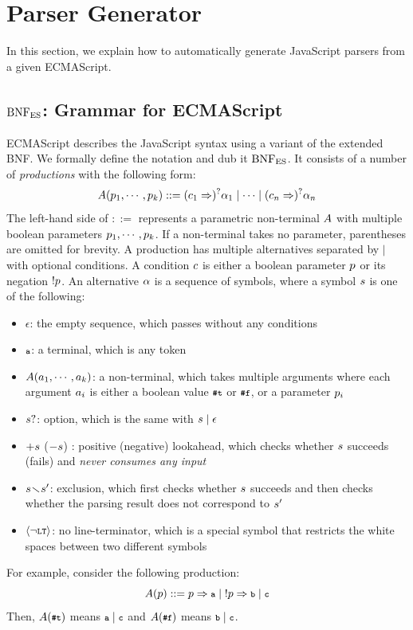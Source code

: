 \section{Parser Generator}\label{sec:parser}
In this section, we explain how to automatically generate JavaScript
parsers from a given ECMAScript.

\subsection{\( \text{BNF}_{\text{ES}} \): Grammar for ECMAScript}
ECMAScript describes the JavaScript syntax using a variant of the extended BNF.
We formally define the notation and dub it \( \text{BNF}_{\text{ES}} \).  It consists of a
number of \textit{productions} with the following form:
\[
  A(p_1, \cdots, p_k) ::=
  (c_1 \Rightarrow)^? \alpha_1 \mid
  \cdots \mid
  (c_n \Rightarrow)^? \alpha_n
\]
The left-hand side of $::=$ represents a parametric non-terminal \( A \)
with multiple boolean parameters \( p_1, \cdots, p_k \).
If a non-terminal takes no parameter, parentheses are omitted for brevity.
A production has multiple alternatives separated by $\mid$ with optional conditions.
A condition \( c \) is either a boolean parameter \( p \)
or its negation \( ! p \).  An alternative \( \alpha \) is a sequence
of symbols, where a symbol \( s \) is one of the following:
\begin{itemize}[leftmargin=0.5cm]
\item \( \epsilon \): the empty sequence, which passes without any conditions
\item \( \texttt{\footnotesize a} \): a terminal, which is any token
\item \( A(a_1, \cdots, a_k) \): a non-terminal,
which takes multiple arguments where each argument \( a_i \) is
either a boolean value \( \texttt{\footnotesize\#t} \) or \( \texttt{\footnotesize\#f} \), or a parameter \( p_i \)
\item \( s? \): option, which is the same with \( s \mid \epsilon \)
\item \( +s \) (\( -s \)) : positive (negative) lookahead,
which checks whether \( s \) succeeds (fails) and
\textit{never consumes any input}
\item \( s \!\smallsetminus\! s' \): exclusion, which
first checks whether \( s \) succeeds
and then checks whether the parsing result does not correspond to \( s' \)
\item \( \left<\neg\texttt{\footnotesize LT}\right> \): no line-terminator, which is a special symbol
that restricts the white spaces between two different symbols
\end{itemize}
For example, consider the following production:
\[
  A(p) ::= p \Rightarrow \texttt{\footnotesize a}
  \mid \; !p \Rightarrow \texttt{\footnotesize b}
  \mid  \texttt{\footnotesize c}
\]
Then, \( A(\texttt{\footnotesize\#t}) \) means \( \texttt{\footnotesize a} \mid \texttt{\footnotesize c} \)
and \( A(\texttt{\footnotesize\#f}) \) means \( \texttt{\footnotesize b} \mid \texttt{\footnotesize c} \).

